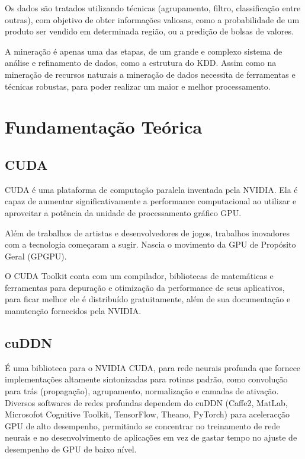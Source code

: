 \documentclass[conference]{IEEEtran}
\begin{document}
    Os dados s\~ao tratados  utilizando t\'ecnicas (agrupamento, filtro, classifica\c{c}\~ao entre outras), com objetivo de obter informa\c{c}\~oes valiosas, como a probabilidade de um produto ser vendido em determinada regi\~ao, ou a predi\c{c}\~ao de bolsas de valores.
	
	A minera\c{c}\~ao \'e apenas uma das etapas, de um grande e complexo sistema de an\'alise e refinamento de dados, como a estrutura do KDD.
	Assim como na minera\c{c}\~ao de recursos naturais a minera\c{c}\~ao de dados necessita de ferramentas e t\'ecnicas robustas, para poder realizar um maior e melhor processamento.
	\section{Fundamenta\c{c}\~ao Te\'orica}
	
	\subsection{CUDA}
	CUDA \'e uma plataforma de computa\c{c}\~ao paralela inventada pela NVIDIA. Ela \'e capaz de aumentar significativamente a performance computacional ao utilizar e aproveitar a pot\^encia da unidade de processamento gr\'afico GPU.
	
	Al\'em de trabalhos de artistas e desenvolvedores de jogos, trabalhos inovadores com a tecnologia come\c{c}aram a sugir. Nascia o movimento da GPU de Prop\'osito Geral 
	(GPGPU).
	
	O CUDA Toolkit conta com um compilador, bibliotecas de matem\'aticas e ferramentas para depura\c{c}\~ao e otimiza\c{c}\~ao da performance de seus aplicativos, para ficar melhor ele   \'e distribu\'ido gratuitamente, al\'em de sua documenta\c{c}\~ao e manuten\c{c}\~ao fornecidos pela NVIDIA.
	
	\subsection{cuDDN}
	\'E uma biblioteca para o NVIDIA CUDA, para rede neurais profunda que fornece implementa\c{c}\~oes altamente sintonizadas para rotinas padr\~ao, como convolu\c{c}\~ao para tr\'as (propaga\c{c}\~ao), agrupamento, normaliza\c{c}\~ao e camadas de ativa\c{c}\~ao.
	Diversos softwares de redes profundas dependem do cuDDN (Caffe2, MatLab, Microsofot Cognitive Toolkit, TensorFlow, Theano, PyTorch) para acelerac\c{c}\~ao GPU de alto desempenho, permitindo se concentrar no treinamento de rede neurais e no desenvolvimento de aplica\c{c}\~oes em vez de gastar tempo no ajuste de desempenho de GPU de baixo n\'ivel.
	
\end{document}
